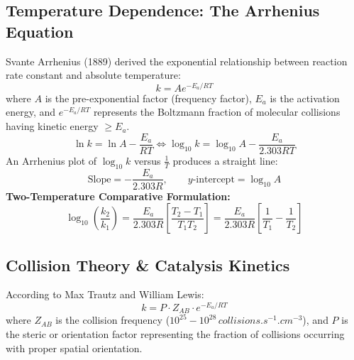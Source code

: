 \documentclass[10pt,a4paper]{article}
\begin{document}
\subsection{Temperature Dependence: The Arrhenius Equation}
Svante Arrhenius (1889) derived the exponential relationship between reaction rate constant and absolute temperature:
\begin{equation}
  k = A e^{-E_a / R T}
\end{equation}
where $A$ is the pre-exponential factor (frequency factor), $E_a$ is the activation energy, and $e^{-E_a / R T}$ represents the Boltzmann fraction of molecular collisions having kinetic energy $\ge E_a$.
\begin{equation}
  \ln k = \ln A - \frac{E_a}{R T} \iff \log_{10} k = \log_{10} A - \frac{E_a}{2.303 R T}
\end{equation}
An Arrhenius plot of $\log_{10} k$ versus $\frac{1}{T}$ produces a straight line:
\begin{equation}
  \text{Slope} = -\frac{E_a}{2.303 R}, \qquad y\text{-intercept} = \log_{10} A
\end{equation}
\textbf{Two-Temperature Comparative Formulation:}
\begin{equation}
  \log_{10}\left(\frac{k_2}{k_1}\right) = \frac{E_a}{2.303 R}\left[\frac{T_2 - T_1}{T_1 T_2}\right] = \frac{E_a}{2.303 R}\left[\frac{1}{T_1} - \frac{1}{T_2}\right]
\end{equation}

\subsection{Collision Theory \& Catalysis Kinetics}
According to Max Trautz and William Lewis:
\begin{equation}
  k = P \cdot Z_{AB} \cdot e^{-E_a / R T}
\end{equation}
where $Z_{AB}$ is the collision frequency ($10^{25} - 10^{28}\,\si{collisions.s^{-1}.cm^{-3}}$), and $P$ is the steric or orientation factor representing the fraction of collisions occurring with proper spatial orientation.
\end{document}
